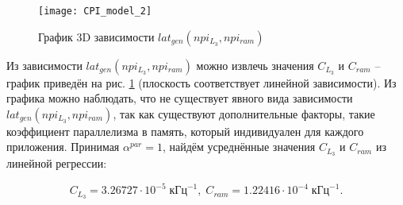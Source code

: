     \begin{figure}[!h]
        \caption{График 3D зависимости $lat_{gen}(npi_{L_3}, npi_{ram})$}
        \centering
        \texttt{[image: CPI\_model\_2]}
        \label{pic:cpi_model_2}
    \end{figure}

    Из зависимости $lat_{gen}(npi_{L_3}, npi_{ram})$ можно извлечь значения $C_{L_3}$ и $C_{ram}$ --
    график приведён на рис. \ref{pic:cpi_model_2} (плоскость соответствует линейной
    зависимости). Из графика можно наблюдать, что не существует явного вида зависимости
    $lat_{gen}(npi_{L_3}, npi_{ram})$, так как существуют дополнительные факторы, такие коэффициент
    параллелизма в память, который индивидуален для каждого приложения. Принимая $\alpha^{par} = 1$,
    найдём усреднённые значения $C_{L_3}$ и $C_{ram}$ из линейной регрессии:

    \begin{equation}
        C_{L_3} = 3.26727 \cdot 10^{-5} \; \text{кГц}^{-1}, \; C_{ram} = 1.22416 \cdot 10^{-4} \; \text{кГц}^{-1}.
    \end{equation}







\newpage
